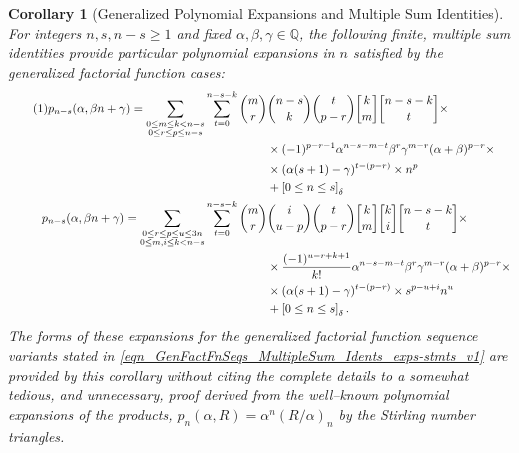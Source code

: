 \documentclass[12pt,reqno]{article}
\numberwithin{sfootnote}{section}
\numberwithin{equation}{section}
\newcommand{\tagonce}[0]{
     \addtocounter{equation}{1}
     \tag{\theequation}
}
\theoremstyle{plain}
\newtheorem{cor}[theorem]{Corollary}
\theoremstyle{definition}
\theoremstyle{remark}
\newcommand{\gkpSI}[2]{\ensuremath{\genfrac{\lbrack}{\rbrack}{0pt}{}{#1}{#2}}}
\newcommand{\Pochhammer}[2]{\ensuremath{\left(#1\right)_{#2}}}
\newcommand{\Iverson}[1]{\ensuremath{\left[#1\right]_{\delta}}}
\begin{document}
\begin{cor}[Generalized Polynomial Expansions and Multiple Sum Identities] 
\label{cor_GenFactFnSeqs_MultipleSummationIdents} 
For integers $n,s,n-s \geq 1$ and fixed 
$\alpha, \beta, \gamma \in \mathbb{Q}$, the 
following finite, multiple sum identities provide 
particular polynomial expansions in $n$ satisfied by the 
generalized factorial function cases: 
\begin{align*} 
\tagonce\label{eqn_GenFactFnSeqs_MultipleSum_Idents_exps-stmts_v1} 
p_{n-s}(\alpha, \beta n + \gamma) = 
     \sum\limits_{
          \substack{0 \leq m \leq k < n-s \\ 0 \leq r \leq p \leq n-s}
          } 
     \sum_{t=0}^{n-s-k} 
     \binom{m}{r} & \binom{n-s}{k} \binom{t}{p-r} 
     \gkpSI{k}{m} \gkpSI{n-s-k}{t} 
     \times \\ 
     & \times 
     (-1)^{p-r-1} 
     \alpha^{n-s-m-t} \beta^{r} \gamma^{m-r} 
     (\alpha + \beta)^{p-r} \times \\ 
     & \times 
     (\alpha (s+1) - \gamma)^{t-(p-r)} \times n^{p} \\ 
     & + 
     \Iverson{0 \leq n \leq s} \\ 
p_{n-s}(\alpha, \beta n + \gamma) = 
     \sum\limits_{ 
          \substack{0 \leq r \leq p \leq u \leq 3n \\ 
          0 \leq m,i \leq k < n-s} 
          } 
     \sum_{t=0}^{n-s-k} 
     \binom{m}{r} & \binom{i}{u-p} \binom{t}{p-r} 
     \gkpSI{k}{m} \gkpSI{k}{i} \gkpSI{n-s-k}{t} \times \\ 
     & \times 
     \frac{(-1)^{u-r+k+1}}{k!} \alpha^{n-s-m-t} \beta^{r} \gamma^{m-r} 
     (\alpha + \beta)^{p-r} \times \\ 
     & \times 
     (\alpha (s+1) - \gamma)^{t-(p-r)} \times s^{p-u+i} n^{u} \\ 
     & + 
     \Iverson{0 \leq n \leq s}. 
\end{align*} 
The forms of these expansions for the generalized factorial function 
sequence variants stated in 
\eqref{eqn_GenFactFnSeqs_MultipleSum_Idents_exps-stmts_v1} 
are provided by this corollary without citing the complete details to 
a somewhat tedious, and unnecessary, proof derived from the 
well--known polynomial expansions of the products, 
$p_n(\alpha, R) = \alpha^{n} \Pochhammer{R / \alpha}{n}$ by the 
Stirling number triangles. 
\end{cor} 
\end{document}
